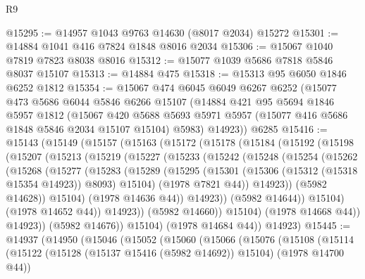 \begin{lexlean}{R9}
\begin{coremodule}
@15295 := @14957 @1043 @9763 @14630 (@8017 @2034) @15272
@15301 := @14884 @1041 @416 @7824 @1848 @8016 @2034
@15306 := @15067 @1040 @7819 @7823 @8038 @8016
@15312 := @15077 @1039 @5686 @7818 @5846 @8037 @15107
@15313 := @14884 @475
@15318 := @15313 @95 @6050 @1846 @6252 @1812
@15354 := @15067
    @474
    @6045
    @6049
    @6267
    @6252
    (@15077
      @473
      @5686
      @6044
      @5846
      @6266
      @15107
      (@14884
        @421
        @95
        @5694
        @1846
        @5957
        @1812
        (@15067
          @420
          @5688
          @5693
          @5971
          @5957
          (@15077 @416 @5686 @1848 @5846 @2034 @15107 @15104)
          @5983)
        @14923))
    @6285
@15416 := @15143
    (@15149
      (@15157
        (@15163
          (@15172
            (@15178
              (@15184
                (@15192
                  (@15198
                    (@15207
                      (@15213
                        (@15219
                          (@15227
                            (@15233
                              (@15242
                                (@15248
                                  (@15254
                                    (@15262
                                      (@15268
                                        (@15277
                                          (@15283
                                            (@15289
                                              (@15295
                                                (@15301
                                                  (@15306 (@15312 (@15318 @15354 @14923)) @8093)
                                                  @15104)
                                                (@1978 @7821 @44))
                                              @14923))
                                          (@5982 @14628))
                                        @15104)
                                      (@1978 @14636 @44))
                                    @14923))
                                (@5982 @14644))
                              @15104)
                            (@1978 @14652 @44))
                          @14923))
                      (@5982 @14660))
                    @15104)
                  (@1978 @14668 @44))
                @14923))
            (@5982 @14676))
          @15104)
        (@1978 @14684 @44))
      @14923)
@15445 := @14937
    (@14950
      (@15046
        (@15052
          (@15060
            (@15066
              (@15076
                (@15108
                  (@15114
                    (@15122 (@15128 (@15137 @15416 (@5982 @14692)) @15104) (@1978 @14700 @44))

\end{coremodule}
\end{lexlean}
